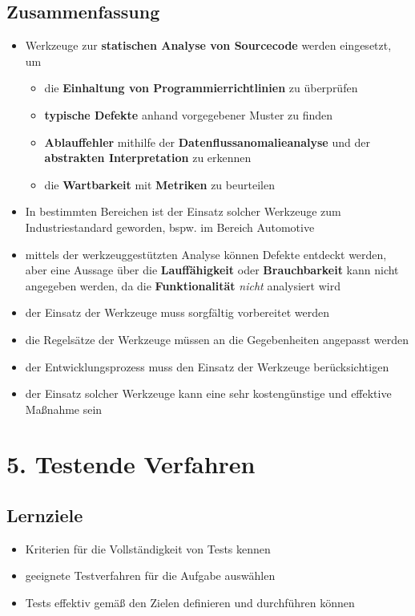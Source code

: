 \subsection*{Zusammenfassung}
\begin{itemize}
    \item Werkzeuge zur \textbf{statischen Analyse von Sourcecode} werden eingesetzt, um
    \begin{itemize}
        \item die \textbf{Einhaltung von Programmierrichtlinien} zu überprüfen
        \item \textbf{typische Defekte} anhand vorgegebener Muster zu finden
        \item \textbf{Ablauffehler} mithilfe der \textbf{Datenflussanomalieanalyse} und der \textbf{abstrakten Interpretation} zu erkennen
        \item die \textbf{Wartbarkeit} mit \textbf{Metriken} zu beurteilen
    \end{itemize}
    \item In bestimmten Bereichen ist der Einsatz solcher Werkzeuge zum Industriestandard geworden, bspw. im Bereich Automotive
    \item mittels der werkzeuggestützten Analyse können Defekte entdeckt werden, aber eine Aussage über die \textbf{Lauffähigkeit} oder \textbf{Brauchbarkeit} kann nicht angegeben werden, da die \textbf{Funktionalität} \textit{nicht} analysiert wird
    \item der Einsatz der Werkzeuge muss sorgfältig vorbereitet werden
    \item die Regelsätze der Werkzeuge müssen an die Gegebenheiten angepasst werden
    \item der Entwicklungsprozess muss den Einsatz der Werkzeuge berücksichtigen
    \item der Einsatz solcher Werkzeuge kann eine sehr kostengünstige und effektive Maßnahme sein
\end{itemize}

\section*{5. Testende Verfahren}
\subsection*{Lernziele}
\begin{itemize}
    \item Kriterien für die Vollständigkeit von Tests kennen
    \item geeignete Testverfahren für die Aufgabe auswählen
    \item Tests effektiv gemäß den Zielen definieren und durchführen können
\end{itemize}

